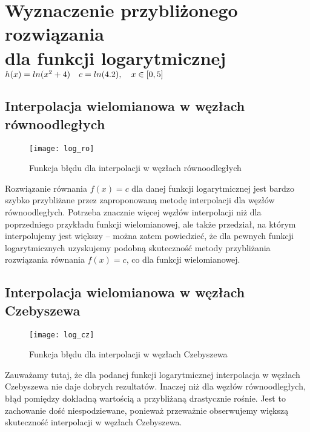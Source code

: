 \documentclass{article}
\begin{document}
\clearpage

\section{Wyznaczenie przybliżonego rozwiązania \\ dla funkcji logarytmicznej $ h(x) = ln(x^2 + 4) \\ \quad c = ln(4.2), \quad x \in [0,5] $}
\subsection{Interpolacja wielomianowa w węzłach równoodległych}
\begin{figure}[ht]
	\begin{center}
		\texttt{[image: log\_ro]}
	\end{center}
	\caption{Funkcja błędu dla interpolacji w węzłach równoodległych}
	\label{fig:5}
\end{figure}
\indent Rozwiązanie równania $ f(x) = c $ dla danej funkcji logarytmicznej jest bardzo szybko przybliżane przez zaproponowaną metodę interpolacji dla węzłów równoodległych.
Potrzeba znacznie więcej węzłów interpolacji niż dla poprzedniego przykładu funkcji wielomianowej, ale także przedział, na którym interpolujemy jest większy -- można zatem powiedzieć, że 
dla pewnych funkcji logarytmicznych uzyskujemy podobną skuteczność metody przybliżania rozwiązania równania $ f(x) = c $, co dla funkcji wielomianowej.

\clearpage

\subsection{Interpolacja wielomianowa w węzłach Czebyszewa}
\begin{figure}[ht]
	\begin{center}
		\texttt{[image: log\_cz]}
	\end{center}
	\caption{Funkcja błędu dla interpolacji w węzłach Czebyszewa}
	\label{fig:5}
\end{figure}
\indent Zauważamy tutaj, że dla podanej funkcji logarytmicznej interpolacja w węzłach Czebyszewa nie daje dobrych rezultatów.
Inaczej niż dla węzłów równoodległych, błąd pomiędzy dokładną wartością a przybliżaną drastycznie rośnie. Jest to zachowanie dość niespodziewane,
ponieważ przeważnie obserwujemy większą skuteczność interpolacji w węzłach Czebyszewa.

\clearpage
\end{document}
